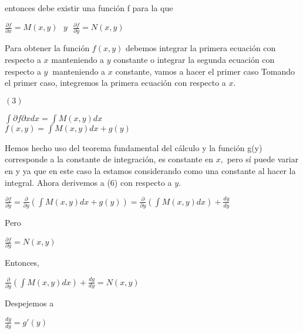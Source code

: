 \documentclass[l etterpaper,11pt]{article}
\begin{document}
entonces debe existir una función f para la que
\begin{center}

$\frac{\partial f}{\partial x}=M(x,y)\ \ \ y\ \ \ \frac{\partial f}{\partial y}=N(x,y)$\\
\end{center}

Para obtener la función $ f(x,y) $ debemos integrar la primera ecuación con respecto a $ x $ manteniendo a $ y $ constante o integrar la segunda ecuación con respecto a $ y\ $ manteniendo a $ x $ constante, vamos a hacer el primer caso 
Tomando el primer caso, integremos la primera ecuación con respecto a $ x.$
\begin{flushleft} 
$(3)$
\end{flushleft}

\begin{center}

$\int\partial f\partial xdx=\int M(x,y)dx$\\
$f(x,y)=\int M(x,y)dx+g(y)$\\
\end{center}

Hemos hecho uso del teorema fundamental del cálculo y la función g(y) corresponde a la constante de integración, es constante en $ x, $ pero sí puede variar en y ya que en este caso la estamos considerando como una constante al hacer la integral.
Ahora derivemos a (6) con respecto a $ y $. 
\begin{center}

$\frac{\partial f}{\partial y}=\frac{\partial}{\partial y}(\int M(x,y)dx+g(y))=\frac{\partial}{\partial y}(\int M(x,y)dx)+\frac{dg}{dy}$\\
\end{center}

Pero
\begin{center}

$\frac{\partial f}{\partial y}=N(x,y)$\\
\end{center}

Entonces,
\begin{center}

$\frac{\partial}{\partial y}(\int M(x,y)dx)+\frac{dg}{dy}=N(x,y)$\\
\end{center}

Despejemos a
\begin{center}


$\frac{dg}{dy}=g\prime(y)$\\
\end{center}
\end{document}
